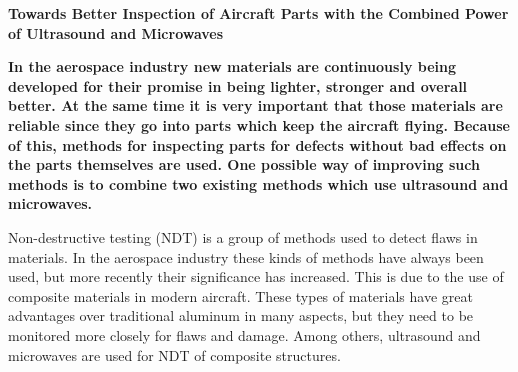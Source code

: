 \documentclass[11pt]{article}
\begin{document}
	
	\begingroup
		\centering
		\LARGE \textbf{Towards Better Inspection of Aircraft Parts with the Combined Power of Ultrasound and Microwaves} \par
		\vspace{1.0cm}
	\endgroup
	
	\begin{multicols}{2}
		\noindent
		\textbf{
			In the aerospace industry new materials are continuously being developed for their promise in being lighter, stronger and overall better. At the same time it is very important that those materials are reliable since they go into parts which keep the aircraft flying. Because of this, methods for inspecting parts for defects without bad effects on the parts themselves are used. One possible way of improving such methods is to combine two existing methods which use ultrasound and microwaves.
		}
		
		\noindent
		Non-destructive testing (NDT) is a group of methods used to detect flaws in materials. In the aerospace industry these kinds of methods have always been used, but more recently their significance has increased. This is due to the use of composite materials in modern aircraft. These types of materials have great advantages over traditional aluminum in many aspects, but they need to be monitored more closely for flaws and damage. Among others, ultrasound and microwaves are used for NDT of composite structures. 
		
	\end{multicols}
	
\end{document}

